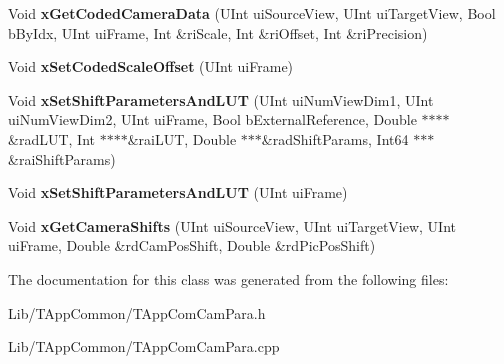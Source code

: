 \begin{DoxyCompactItemize}
Void {\bfseries x\+Get\+Coded\+Camera\+Data} (U\+Int ui\+Source\+View, U\+Int ui\+Target\+View, Bool b\+By\+Idx, U\+Int ui\+Frame, Int \&ri\+Scale, Int \&ri\+Offset, Int \&ri\+Precision)
\item 
\mbox{\label{class_t_app_com_cam_para_a6c98605e118c53067f9344e4239c68d6}} 
Void {\bfseries x\+Set\+Coded\+Scale\+Offset} (U\+Int ui\+Frame)
\item 
\mbox{\label{class_t_app_com_cam_para_a23e3d01def98c04d1fdf16db6137402d}} 
Void {\bfseries x\+Set\+Shift\+Parameters\+And\+L\+UT} (U\+Int ui\+Num\+View\+Dim1, U\+Int ui\+Num\+View\+Dim2, U\+Int ui\+Frame, Bool b\+External\+Reference, Double $\ast$$\ast$$\ast$$\ast$\&rad\+L\+UT, Int $\ast$$\ast$$\ast$$\ast$\&rai\+L\+UT, Double $\ast$$\ast$$\ast$\&rad\+Shift\+Params, Int64 $\ast$$\ast$$\ast$\&rai\+Shift\+Params)
\item 
\mbox{\label{class_t_app_com_cam_para_ad2ab4187296117b1ad3c8a178f529eb8}} 
Void {\bfseries x\+Set\+Shift\+Parameters\+And\+L\+UT} (U\+Int ui\+Frame)
\item 
\mbox{\label{class_t_app_com_cam_para_ac06c7f1be0bd1f390b1cab2ba83d0f64}} 
Void {\bfseries x\+Get\+Camera\+Shifts} (U\+Int ui\+Source\+View, U\+Int ui\+Target\+View, U\+Int ui\+Frame, Double \&rd\+Cam\+Pos\+Shift, Double \&rd\+Pic\+Pos\+Shift)
\end{DoxyCompactItemize}


The documentation for this class was generated from the following files\+:\begin{DoxyCompactItemize}
\item 
Lib/\+T\+App\+Common/T\+App\+Com\+Cam\+Para.\+h\item 
Lib/\+T\+App\+Common/T\+App\+Com\+Cam\+Para.\+cpp\end{DoxyCompactItemize}
